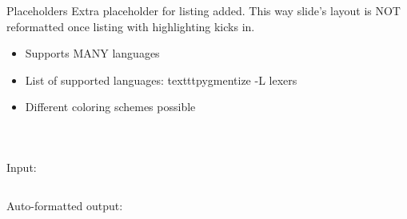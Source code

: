 {
\begin{block}{Placeholders}
Extra placeholder for listing added.
This way slide's layout is NOT reformatted once listing with highlighting kicks in.
\end{block}

}


{
\begin{itemize}
\item Supports MANY languages
\item List of supported languages: texttt{pygmentize -L lexers}
\item Different coloring schemes possible
\end{itemize}
}


{
\inputminted[linenos]{ini}{misc/inventory.ini}
}


{
\inputminted[linenos]{bash}{misc/script.sh}
}


{
\inputminted[linenos]{json}{json/mice.format.json}
}


{
Input:
\inputminted[linenos]{json}{json/json_to_reformat.json}

\vspace{1em}

Auto-formatted output:
\inputminted[linenos]{json}{json/json_to_reformat.format.json}
}
